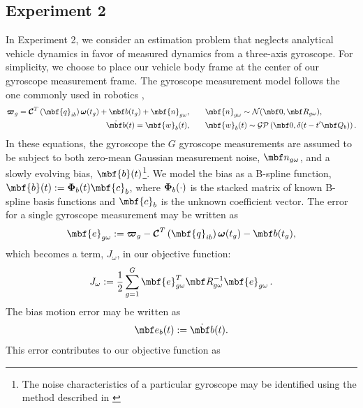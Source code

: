 \documentclass[11pt,a4paper,oneside]{article}
\begin{document}
\subsection{Experiment 2}
In Experiment 2, we consider an estimation problem that neglects analytical vehicle dynamics in favor of measured dynamics from a three-axis gyroscope. For simplicity, we choose to place our vehicle body frame at the center of our gyroscope measurement frame. The gyroscope measurement model follows the one commonly used in robotics \citep{Mirzaei0800,Kelly1100},
\begin{subequations}
\label{eq:measurement-gyro}
\begin{flalign}
  \mbs{\varpi}_{g} = \mbc{C}^{T}\left(\mbf{q}_{ib}\right)\mbs{\omega}(t_g) + \mbf b(t_g) + \mbf{n}_{g\omega},&\qquad \mbf{n}_{g\omega} \sim \mathcal{N}(\mbf 0, \mbf R_{g\omega}),\\
\mbfdot{b}(t) = \mbf{w}_{b}(t),&\qquad \mbf{w}_{b}(t) \sim \mathcal{GP}\left(\mbf 0,  \delta(t - t^{\prime}\mbf Q_{b}) \right).
\end{flalign}
\end{subequations}
In these equations, the gyroscope the $G$ gyroscope measurements are assumed to be subject to both zero-mean Gaussian measurement noise, $\mbf n_{g\omega}$, and a slowly evolving bias, $\mbf{b}(t)$\footnote{The noise characteristics of a particular gyroscope may be identified using the method described in \citet{ieee1998ieee}}. We model the bias as a B-spline function, $\mbf{b}(t) := \mbs{\Phi}_{b}(t) \mbf{c}_{b}$, where ${\boldsymbol{\Phi}}_{b}(\cdot)$ is the stacked matrix of known B-spline basis functions and $\mbf{c}_{b}$ is the unknown coefficient vector. The error for a single gyroscope measurement may be written as
\begin{equation}
  \label{eq:gyro-error}
  \mbf{e}_{g\omega} := \mbs{\varpi}_{g} - \mbc{C}^{T}\left(\mbf{q}_{ib}\right)\mbs{\omega}(t_{g}) - \mbf b(t_g),
\end{equation}
which becomes a term, $J_{\omega}$, in our objective function:
\begin{equation}
  \label{eq:gyro-objective}
  J_{\omega} := \frac{1}{2} \sum_{g=1}^{G} \mbf{e}_{g\omega}^{T} \mbf R_{g\omega}^{-1} \mbf{e}_{g\omega}\,.
\end{equation}
The bias motion error may be written as
\begin{equation}
  \label{eq:bias-motion-error}
  \mbf e_{b}(t) := \mbfdot{b}(t).
\end{equation}
This error contributes to our objective function as
\end{document}
